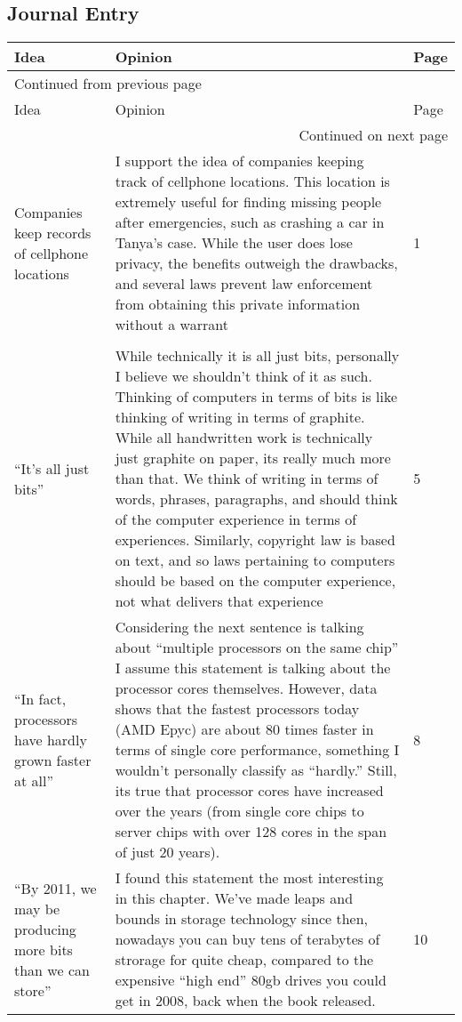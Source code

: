 \documentclass[11pt]{article}
\begin{document}
\subsection{Journal Entry}
\label{sec:org7a4380e}
\begin{longtable}{|p{2.5cm}|p{6.5cm}|p{1cm}|}
Idea & Opinion & Page\\
\hline
\endfirsthead
\multicolumn{3}{l}{Continued from previous page} \\
\hline

Idea & Opinion & Page \\

\hline
\endhead
\hline\multicolumn{3}{r}{Continued on next page} \\
\endfoot
\endlastfoot
\hline
Companies keep records of cellphone locations & I support the idea of companies keeping track of cellphone locations. This location is extremely useful for finding missing people after emergencies, such as crashing a car in Tanya's case. While the user does lose privacy, the benefits outweigh the drawbacks, and several laws prevent law enforcement from obtaining this private information without a warrant & 1\\
 &  & \\
\hline
``It's all just bits'' & While technically it is all just bits, personally I believe we shouldn't think of it as such. Thinking of computers in terms of bits is like thinking of writing in terms of graphite. While all handwritten work is technically just graphite on paper, its really much more than that. We think of writing in terms of words, phrases, paragraphs, and should think of the computer experience in terms of experiences. Similarly, copyright law is based on text, and so laws pertaining to computers should be based on the computer experience, not what delivers that experience & 5\\
\hline
``In fact, processors have hardly grown faster at all'' & Considering the next sentence is talking about ``multiple processors on the same chip'' I assume this statement is talking about the processor cores themselves. However, data shows that the fastest processors today (AMD Epyc) are about 80 times faster in terms of single core performance, something I wouldn't personally classify as ``hardly.'' Still, its true that processor cores have increased over the years (from single core chips to server chips with over 128 cores in the span of just 20 years). & 8\\
\hline
``By 2011, we may be producing more bits than we can store'' & I found this statement the most interesting in this chapter. We've made leaps and bounds in storage technology since then, nowadays you can buy tens of terabytes of strorage for quite cheap, compared to the expensive ``high end'' 80gb drives you could get in 2008, back when the book released. & 10\\
\end{longtable}
\end{document}
